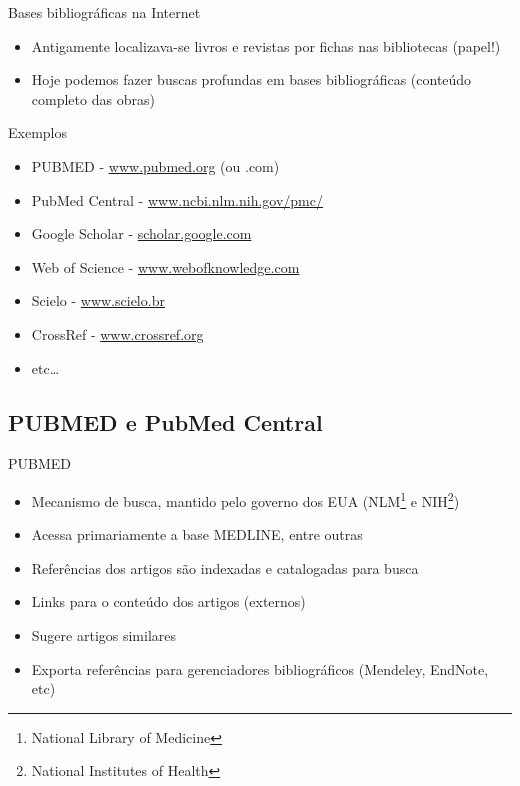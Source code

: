 \documentclass{beamer}
\begin{document}
\begin{frame}{Bases bibliográficas na Internet}
  \begin{itemize}
  \item Antigamente localizava-se livros e revistas por fichas nas
    bibliotecas (papel!)
  \item Hoje podemos fazer buscas profundas em bases bibliográficas
    (conteúdo completo das obras)
  \end{itemize}
\end{frame}

\begin{frame}{Exemplos}
  \begin{itemize}
  \item \alert{PUBMED} - \url{www.pubmed.org} (ou .com)
  \item \alert{PubMed Central} - \url{www.ncbi.nlm.nih.gov/pmc/}
  \item \alert{Google Scholar} - \url{scholar.google.com}
  \item<4-> Web of Science - \url{www.webofknowledge.com}
  \item<4-> Scielo - \url{www.scielo.br}
  \item<4-> CrossRef - \url{www.crossref.org}
  \item<4-> etc\ldots
  \end{itemize}
\end{frame}

\subsection{PUBMED e PubMed Central}

\begin{frame}{PUBMED}
  \begin{itemize}
  \item \alert{Mecanismo de busca}, mantido pelo governo dos EUA
    (NLM\footnote{National Library of Medicine} e
    NIH\footnote{National Institutes of Health})
  \item Acessa primariamente a base MEDLINE, entre outras
  \item Referências dos artigos são indexadas e catalogadas para busca
  \item Links para o conteúdo dos artigos (externos)
  \item Sugere artigos similares
  \item Exporta referências para gerenciadores bibliográficos
    (Mendeley, EndNote, etc)
  \end{itemize}
\end{frame}
\end{document}
